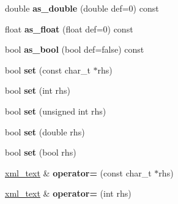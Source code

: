 \begin{DoxyCompactItemize}
\item 
\hypertarget{classpugi_1_1xml__text_aa6722fcf1c4e10ee11b6df73bef11cee}{double {\bfseries as\-\_\-double} (double def=0) const }\label{classpugi_1_1xml__text_aa6722fcf1c4e10ee11b6df73bef11cee}

\item 
\hypertarget{classpugi_1_1xml__text_a158482df06cd778542d7cedb1c33e39f}{float {\bfseries as\-\_\-float} (float def=0) const }\label{classpugi_1_1xml__text_a158482df06cd778542d7cedb1c33e39f}

\item 
\hypertarget{classpugi_1_1xml__text_ab591c10f3adc62024cf8ffc53c4e372e}{bool {\bfseries as\-\_\-bool} (bool def=false) const }\label{classpugi_1_1xml__text_ab591c10f3adc62024cf8ffc53c4e372e}

\item 
\hypertarget{classpugi_1_1xml__text_ab31930ff4f5ad568549f85dbb697e60e}{bool {\bfseries set} (const char\-\_\-t $\ast$rhs)}\label{classpugi_1_1xml__text_ab31930ff4f5ad568549f85dbb697e60e}

\item 
\hypertarget{classpugi_1_1xml__text_a66ebe5bd62e843197305ed68661b0a26}{bool {\bfseries set} (int rhs)}\label{classpugi_1_1xml__text_a66ebe5bd62e843197305ed68661b0a26}

\item 
\hypertarget{classpugi_1_1xml__text_a9d780e113aa0b1f4bbf2d0a88fe2c42f}{bool {\bfseries set} (unsigned int rhs)}\label{classpugi_1_1xml__text_a9d780e113aa0b1f4bbf2d0a88fe2c42f}

\item 
\hypertarget{classpugi_1_1xml__text_acf32e49c31a07f7bad1f9bdfb71bdc1e}{bool {\bfseries set} (double rhs)}\label{classpugi_1_1xml__text_acf32e49c31a07f7bad1f9bdfb71bdc1e}

\item 
\hypertarget{classpugi_1_1xml__text_a0d75ccc7ede3b3d590352267a0f0fcb9}{bool {\bfseries set} (bool rhs)}\label{classpugi_1_1xml__text_a0d75ccc7ede3b3d590352267a0f0fcb9}

\item 
\hypertarget{classpugi_1_1xml__text_a0b895996d14f50afca11b9a82276038d}{\hyperlink{classpugi_1_1xml__text}{xml\-\_\-text} \& {\bfseries operator=} (const char\-\_\-t $\ast$rhs)}\label{classpugi_1_1xml__text_a0b895996d14f50afca11b9a82276038d}

\item 
\hypertarget{classpugi_1_1xml__text_a594653404f095b07d4644a0567f9ec51}{\hyperlink{classpugi_1_1xml__text}{xml\-\_\-text} \& {\bfseries operator=} (int rhs)}\label{classpugi_1_1xml__text_a594653404f095b07d4644a0567f9ec51}


\end{DoxyCompactItemize}
